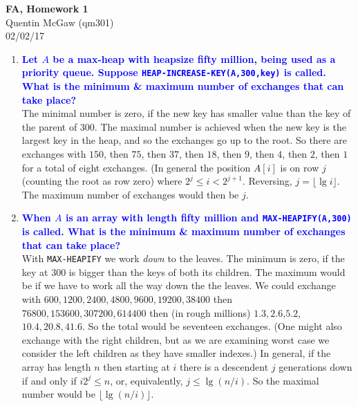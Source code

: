 \documentclass[11pt]{article}
\begin{document}
\begin{center} {\Large\bf FA, Homework 1}  \\ Quentin McGaw (qm301) \\ 02/02/17
\end{center}

\begin{enumerate}
\item \textbf{\textcolor{blue}{Let $A$ be a max-heap with heapsize fifty 
million, being used as a priority queue.  Suppose 
{\tt HEAP-INCREASE-KEY(A,300,key)} is called. What is the minimum & maximum number 
of exchanges that can take place?}}
    \\ The minimal number is zero, if the new key has smaller value than
    the key of the parent of $300$.  The maximal number is achieved when
    the new key is the largest key in the heap, and so the exchanges go
    up to the root.  So there are exchanges with $150$, then $75$, then
    $37$, then $18$, then $9$, then $4$, then $2$, then $1$ for a total
    of eight exchanges.  (In general the position $A[i]$ is on row
    $j$ (counting the root as row zero)
    where $2^j\leq i < 2^{j+1}$.  Reversing, $j=\lfloor \lg i\rfloor$.
    The maximum number of exchanges would then be $j$.

\item \textbf{\textcolor{blue}{When $A$ is an array with length fifty 
million and {\tt MAX-HEAPIFY(A,300)} is called. What is the minimum & maximum 
number of exchanges that can take place?}}
    \\ With {\tt MAX-HEAPIFY} we work {\em down} to the leaves.  The minimum
    is zero, if the key at $300$ is bigger than the keys of both its children.
    The maximum would be if we have to work all the way down the the leaves.
    We could exchange with $600,1200,2400,4800,9600,19200,38400$ 
    then $76800,153600,307200,614400$ then (in rough millions) $1.3,2.6$,$5.2$,
    $10.4, 20.8,41.6$.  So the total would be seventeen exchanges.  (One might also 
    exchange with the right children, but as we are examining worst case we
    consider the left children as they have smaller indexes.)  In general, if
    the array has length $n$ then starting at $i$ there is a descendent $j$
    generations down if and only if $i2^j\leq n$, or, equivalently, $j \leq \lg(n/i)$.
    So the maximal number would be $\lfloor \lg(n/i)\rfloor$.


\end{enumerate}
\end{document}

